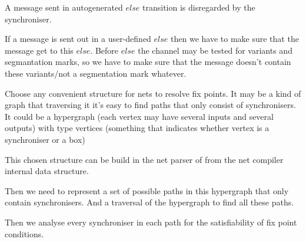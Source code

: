 A message sent in autogenerated $else$ transition is disregarded by the synchroniser.

If a message is sent out in a user-defined $else$ then we have to make sure that the message get to this $else$. Before $else$ the channel may be tested for variants and segmantation marks, so we have to make sure that the message doesn't contain these variants/not a segmentation mark whatever.


Choose any convenient structure for nets to resolve fix points. It may be a kind of graph that traversing it it's easy to find paths that only consist of synchronisers.
It could be a hypergraph (each vertex may have several inputs and several outputs) with type vertices (something that indicates whether vertex is a synchroniser or a box)

This chosen structure can be build in the net parser of from the net compiler internal data structure.

Then we need to represent a set of possible paths in this hypergraph that only contain synchronisers. And a traversal of the hypergraph to find all these paths.

Then we analyse every synchroniser in each path for the satisfiability of fix point conditions.
